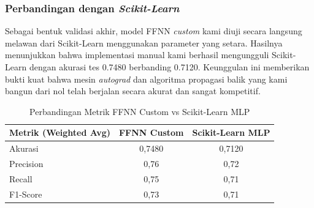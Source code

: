 \subsubsection{Perbandingan dengan \textit{Scikit-Learn}}

Sebagai bentuk validasi akhir, model FFNN \textit{custom} kami diuji secara langsung melawan  dari Scikit-Learn menggunakan parameter yang setara. Hasilnya menunjukkan bahwa implementasi manual kami berhasil mengungguli Scikit-Learn dengan akurasi tes 0.7480 berbanding 0.7120. Keunggulan ini memberikan bukti kuat bahwa mesin \textit{autograd} dan algoritma propagasi balik yang kami bangun dari nol telah berjalan secara akurat dan sangat kompetitif.

\begin{table}[H]
\centering
\caption{Perbandingan Metrik FFNN Custom vs Scikit-Learn MLP}
\begin{tabular}{lcc}
\hline
\textbf{Metrik (Weighted Avg)} & \textbf{FFNN Custom} & \textbf{Scikit-Learn MLP} \\
\hline
Akurasi   & 0,7480 & 0,7120 \\
Precision & 0,76 & 0,72 \\
Recall    & 0,75 & 0,71 \\
F1-Score  & 0,73 & 0,71 \\
\hline
\end{tabular}
\end{table}
